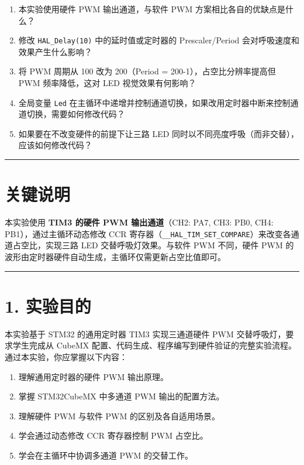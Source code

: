 \documentclass[
  chinese,
  UTF8,
  oneside,
  openany]{ctexbook}
\providecommand{\tightlist}{%
  \setlength{\itemsep}{0pt}\setlength{\parskip}{0pt}}
\begin{document}
\begin{enumerate}
\def\labelenumi{\arabic{enumi}.}
\tightlist
\item
  本实验使用硬件 PWM 输出通道，与软件 PWM 方案相比各自的优缺点是什么？
\item
  修改 \texttt{HAL\_Delay(10)} 中的延时值或定时器的 Prescaler/Period
  会对呼吸速度和效果产生什么影响？
\item
  将 PWM 周期从 100 改为 200（Period = 200-1），占空比分辨率提高但 PWM
  频率降低，这对 LED 视觉效果有何影响？
\item
  全局变量 \texttt{Led}
  在主循环中递增并控制通道切换，如果改用定时器中断来控制通道切换，需要如何修改代码？
\item
  如果要在不改变硬件的前提下让三路 LED
  同时以不同亮度呼吸（而非交替），应该如何修改代码？
\end{enumerate}

\begin{center}\rule{0.5\linewidth}{0.5pt}\end{center}

\section{关键说明}\label{ux5173ux952eux8bf4ux660e-1}

本实验使用 \textbf{TIM3 的硬件 PWM 输出通道}（CH2: PA7, CH3: PB0, CH4:
PB1），通过主循环动态修改 CCR
寄存器（\texttt{\_\_HAL\_TIM\_SET\_COMPARE}）来改变各通道占空比，实现三路
LED 交替呼吸灯效果。与软件 PWM 不同，硬件 PWM
的波形由定时器硬件自动生成，主循环仅需更新占空比值即可。

\begin{center}\rule{0.5\linewidth}{0.5pt}\end{center}

\section{1. 实验目的}\label{ux5b9eux9a8cux76eeux7684-4}

本实验基于 STM32 的通用定时器 TIM3 实现三通道硬件 PWM
交替呼吸灯，要求学生完成从 CubeMX
配置、代码生成、程序编写到硬件验证的完整实验流程。通过本实验，你应掌握以下内容：

\begin{enumerate}
\def\labelenumi{\arabic{enumi}.}
\tightlist
\item
  理解通用定时器的硬件 PWM 输出原理。
\item
  掌握 STM32CubeMX 中多通道 PWM 输出的配置方法。
\item
  理解硬件 PWM 与软件 PWM 的区别及各自适用场景。
\item
  学会通过动态修改 CCR 寄存器控制 PWM 占空比。
\item
  学会在主循环中协调多通道 PWM 的交替工作。
\end{enumerate}
\end{document}
